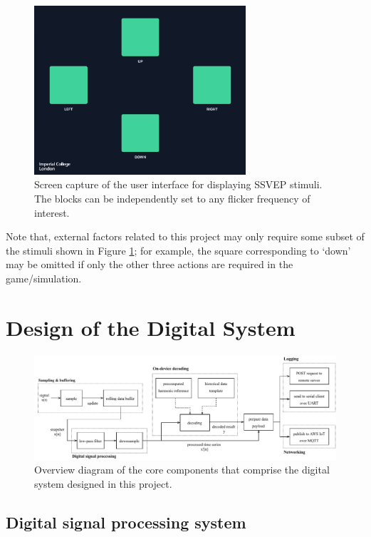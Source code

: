 \begin{figure}[!htb]
    \centering
    \includegraphics[width=0.7\textwidth]{ssvep-squares}
    \caption{Screen capture of the user interface for displaying SSVEP stimuli. The blocks can be independently set to any flicker frequency of interest.}
    \label{fig:ssvep-squares-c5}
\end{figure}

Note that, external factors related to this project may only require some subset of the stimuli shown in Figure \ref{fig:ssvep-squares-c5}; for example, the square corresponding to `down' may be omitted if only the other three actions are required in the game/simulation. 

\section{Design of the Digital System}
\begin{figure}[!htb]
    \centering
    \includegraphics[width=\textwidth]{digital-system-overview}
    \caption{Overview diagram of the core components that comprise the digital system designed in this project.}
    \label{fig:digital-system-overview-c5}
\end{figure}


\subsection{Digital signal processing system}

